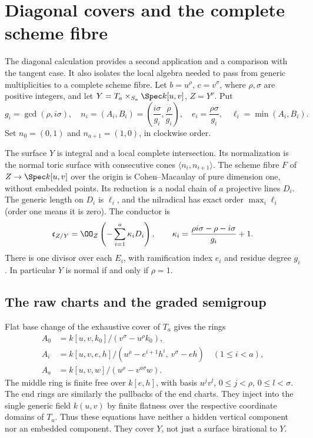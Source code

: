 \section{Diagonal covers and the complete scheme fibre}
\label{sec:diagonal-v171}
The diagonal calculation provides a second application and a comparison
with the tangent case. It also isolates the local algebra needed to
pass from generic multiplicities to a complete scheme fibre. Let
$b=u^\rho$, $c=v^\sigma$, where $\rho,\sigma$ are positive integers,
and let $Y=T_a\times_{S_a}\Spec k[u,v]$, $Z=Y^\nu$. Put
\begin{equation}\label{eq:diagonal-data-v171}
 g_i=\gcd(\rho,i\sigma),\quad
 n_i=(A_i,B_i)=\left(\frac{i\sigma}{g_i},\frac{\rho}{g_i}\right),
 \quad e_i=\frac{\rho\sigma}{g_i},\quad \ell_i=\min(A_i,B_i).
\end{equation}
Set $n_0=(0,1)$ and $n_{a+1}=(1,0)$, in clockwise order.

\begin{theorem}
\label{thm:diagonal-v171}
The surface $Y$ is integral and a local complete intersection. Its
normalization is the normal toric surface with consecutive cones
$\langle n_i,n_{i+1}\rangle$. The scheme fibre $F$ of
$Z\to\Spec k[u,v]$ over the origin is Cohen--Macaulay of pure
dimension one, without embedded points. Its reduction is a nodal
chain of $a$ projective lines $D_i$. The generic length on $D_i$ is
$\ell_i$, and the nilradical has exact order $\max_i\ell_i$ (order
one means it is zero). The conductor is
\begin{equation}\label{eq:diagonal-conductor-v171}
 \mathfrak c_{Z/Y}=\OO_Z\left(-\sum_{i=1}^a\kappa_iD_i\right),
 \qquad
 \kappa_i=\frac{\rho i\sigma-\rho-i\sigma}{g_i}+1.
\end{equation}
There is one divisor over each $E_i$, with ramification index $e_i$
and residue degree $g_i$. In particular $Y$ is normal if and only if
$\rho=1$.
\end{theorem}

\subsection{The raw charts and the graded semigroup}
Flat base change of the exhaustive cover of $T_a$ gives the rings
\begin{align}
 A_0&=k[u,v,k_0]/(v^\sigma-u^\rho k_0),\label{eq:raw-first-v171}\\
 A_i&=k[u,v,e,h]/(u^\rho-e^{i+1}h^i,\ v^\sigma-eh)
       \quad(1\leq i<a),\label{eq:raw-middle-v171}\\
 A_a&=k[u,v,w]/(u^\rho-v^{a\sigma}w).
 \label{eq:raw-last-v171}
\end{align}
The middle ring is finite free over $k[e,h]$, with basis
$u^jv^l$, $0\leq j<\rho$, $0\leq l<\sigma$. The end rings are
similarly the pullbacks of the end charts. They inject into the
single generic field $k(u,v)$ by finite flatness over the respective
coordinate domains of $T_a$. Thus these equations have neither a
hidden vertical component nor an embedded component. They cover $Y$,
not just a surface birational to $Y$.


